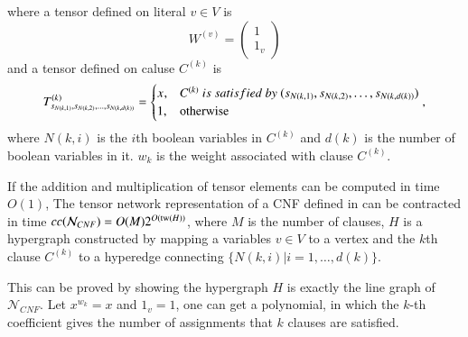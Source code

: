 \documentclass[review, onefignum, onetabnum]{siamart190516}
\begin{document}
where a tensor defined on literal $v \in V$ is
\begin{equation}
    W^{(v)} = \left(\begin{matrix}
    1\\
    1_v
    \end{matrix}\right)
\end{equation}
and a tensor defined on caluse $C^{(k)}$ is
\begin{equation}
T^{(k)}_{s_{N(k, 1)}, s_{N(k, 2)}, \ldots, s_{N(k, d(k))}} = \begin{cases}
    x^{}, &C^{(k)} ~is~ satisfied ~by~ (s_{N(k, 1)}, s_{N(k, 2)}, \ldots, s_{N(k, d(k))})\\
    1, &{\rm otherwise}
\end{cases},
\end{equation}
where $N(k, i)$ is the $i$th boolean variables in $C^{(k)}$ and $d(k)$ is the number of boolean variables in it.
$w_k$ is the weight associated with clause $C^{(k)}$.
\begin{theorem}\label{thm:cnfcomplex}
    If the addition and multiplication of tensor elements can be computed in time $O(1)$,
    The tensor network representation of a CNF defined in  can be contracted in time $cc(\mathcal{N}_{CNF}) = O(M)2^{O({\rm tw}(H))}$, where $M$ is the number of clauses,
    $H$ is a hypergraph constructed by mapping a variables $v\in V$ to a vertex and the $k$th clause $C^{(k)}$ to a hyperedge connecting $\{N(k, i)|i=1,\ldots, d(k)\}$.
\end{theorem}
This can be proved by showing the hypergraph $H$ is exactly the line graph of $\mathcal{N}_{CNF}$.
Let $x^{w_k} = x$ and $1_v = 1$, one can get a polynomial, in which the $k$-th coefficient gives the number of assignments that $k$ clauses are satisfied.
\end{document}
